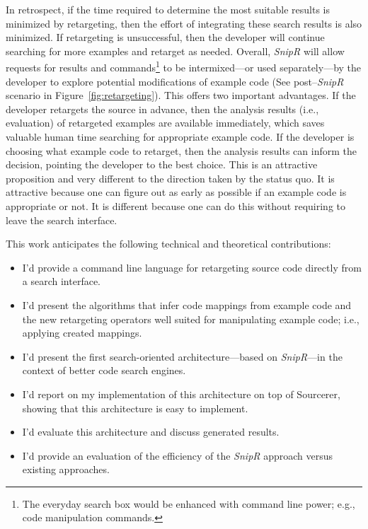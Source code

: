 In retrospect, if the time required to determine the most suitable results is minimized by retargeting, then the effort of integrating these search results is also minimized. If retargeting is unsuccessful, then the developer will continue searching for more examples and retarget as needed. Overall, \emph{SnipR} will allow requests for results and commands\footnote{The everyday search box would be enhanced with command line power; e.g., code manipulation commands.} to be intermixed---or used separately---by the developer to explore potential modifications of example code (See post--\emph{SnipR} scenario in Figure~\ref{fig:retargeting}). This offers two important advantages. If the developer retargets the source in advance, then the analysis results (i.e., evaluation) of retargeted examples are available immediately, which saves valuable human time searching for appropriate example code. If the developer is choosing what example code to retarget, then the analysis results can inform the decision, pointing the developer to the best choice. This is an attractive proposition and very different to the direction taken by the status quo. It is attractive because one can figure out as early as possible if an example code is appropriate or not. It is different because one can do this without requiring to leave the search interface.

This work anticipates the following technical and theoretical contributions:

\begin{itemize}
\item I'd provide a command line language for retargeting source code directly from a search interface. 
\item I'd present the algorithms that infer code mappings from example code and the new 
    retargeting operators well suited for manipulating example code; i.e., applying created mappings.
\item I'd present the first search-oriented architecture---based on \emph{SnipR}---in the context of 
    better code search engines. 
\item I'd report on my implementation of this architecture on top of Sourcerer\cite{Bajracharya:2006vn}, showing that this architecture is easy to implement.
\item I'd evaluate this architecture and discuss generated results.
\item I'd provide an evaluation of the efficiency of the \emph{SnipR} approach versus existing approaches. 
\end{itemize}


